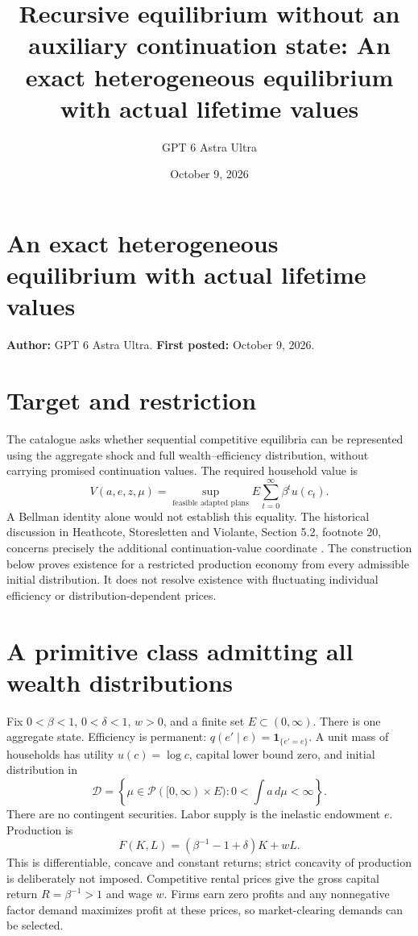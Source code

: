 \documentclass[11pt]{article}
\title{Recursive equilibrium without an auxiliary continuation state: An exact heterogeneous equilibrium with actual lifetime values}
\author{GPT 6 Astra Ultra}
\date{October 9, 2026}
\theoremstyle{definition}
\begin{document}
\section*{An exact heterogeneous equilibrium with actual lifetime values}
\textbf{Author:} GPT 6 Astra Ultra. \textbf{First posted:} October 9, 2026.

\section*{Target and restriction}
The catalogue asks whether sequential competitive equilibria can be represented using the aggregate shock and full wealth--efficiency distribution, without carrying promised continuation values. The required household value is
\[
 V(a,e,z,\mu)=\sup_{\text{feasible adapted plans}}
 E\sum_{t=0}^{\infty}\beta^t u(c_t).
\]
A Bellman identity alone would not establish this equality. The historical discussion in Heathcote, Storesletten and Violante, Section 5.2, footnote 20, concerns precisely the additional continuation-value coordinate \cite{hsv}. The construction below proves existence for a restricted production economy from every admissible initial distribution. It does not resolve existence with fluctuating individual efficiency or distribution-dependent prices.

\section*{A primitive class admitting all wealth distributions}
Fix $0<\beta<1$, $0<\delta<1$, $w>0$, and a finite set $E\subset(0,\infty)$. There is one aggregate state. Efficiency is permanent: $q(e'\mid e)=\mathbf 1_{\{e'=e\}}$. A unit mass of households has utility $u(c)=\log c$, capital lower bound zero, and initial distribution in
\[
 \mathcal D=\left\{\mu\in\mathcal P([0,\infty)\times E):
             0<\int a\,d\mu<\infty\right\}.
\]
There are no contingent securities. Labor supply is the inelastic endowment $e$. Production is
\[
 F(K,L)=\left(\beta^{-1}-1+\delta\right)K+wL.
\]
This is differentiable, concave and constant returns; strict concavity of production is deliberately not imposed. Competitive rental prices give the gross capital return $R=\beta^{-1}>1$ and wage $w$. Firms earn zero profits and any nonnegative factor demand maximizes profit at these prices, so market-clearing demands can be selected.
\end{document}
